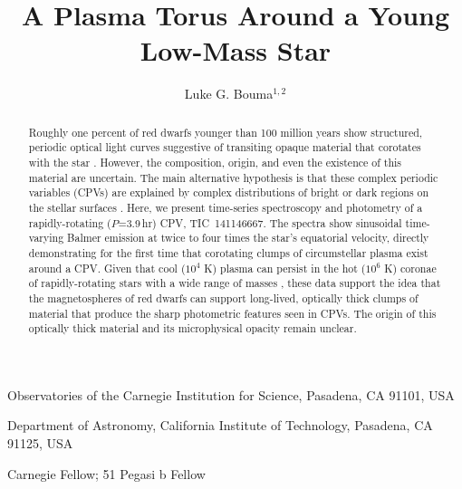\documentclass{nature3}
\title{A Plasma Torus Around a Young Low-Mass Star}
\newcommand{\carnegie}{Observatories of the Carnegie Institution for Science, Pasadena, CA 91101, USA}
\newcommand{\caltech}{Department of Astronomy, California Institute of Technology, Pasadena, CA 91125, USA}
\begin{document}
\author{Luke G. Bouma$^{1,2}$}

\maketitle

\scriptsize
\begin{affiliations}
\item \carnegie
\item \caltech
\item Carnegie Fellow; 51 Pegasi b Fellow
\end{affiliations}
\normalsize


\begin{abstract}
\normalfont
Roughly one percent of red dwarfs younger than 100 million years show
structured, periodic optical light curves suggestive of transiting
opaque material that corotates with the star
\cite{Rebull2016,Stauffer2017,Rebull2018,Bouma2024}.  However, the
composition, origin, and even the existence of this material are
uncertain. The main alternative hypothesis is that these complex
periodic variables (CPVs) are explained by complex distributions of
bright or dark regions on the stellar surfaces \cite{Koen2021}.
Here, we present time-series spectroscopy and photometry of a
rapidly-rotating ($P$=3.9\,hr) CPV, TIC~141146667. The spectra show
sinusoidal time-varying Balmer emission at twice to four times the
star's equatorial velocity, directly demonstrating for the first
time that corotating clumps of circumstellar plasma exist around a CPV.
Given that cool ($10^4$ K) plasma can persist in the hot ($10^6$ K)
coronae of rapidly-rotating stars with a wide range of masses
\cite{CollierCameron1989,Townsend2005,Dunstone2006,Petit2013,Waugh2022,Daley-Yates2024},
these data support the idea that the magnetospheres of red dwarfs can
support long-lived, optically thick clumps of material that produce
the sharp photometric features seen in CPVs.  The origin of this
optically thick material and its microphysical opacity remain
unclear.
\end{abstract}

\maketitle

\end{document}
